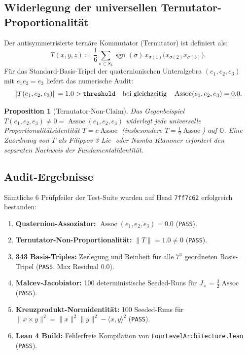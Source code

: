 \documentclass[11pt,a4paper]{article}
\newtheorem{proposition}[theorem]{Proposition}
\theoremstyle{definition}
\newcommand{\Oalg}{\mathbb{O}}
\newcommand{\Assoc}{\operatorname{Assoc}}
\begin{document}
	\subsection{Widerlegung der universellen Ternutator-Proportionalität}
	Der antisymmetrisierte ternäre Kommutator (Ternutator) ist definiert als:
	\begin{equation}
		T(x,y,z) \coloneqq \frac{1}{6} \sum_{\sigma \in S_3} \operatorname{sgn}(\sigma) \, x_{\sigma(1)} \bigl(x_{\sigma(2)} x_{\sigma(3)}\bigr).
	\end{equation}
	Für das Standard-Basis-Tripel der quaternionischen Unteralgebra $(e_1, e_2, e_3)$ mit $e_1 e_2 = e_3$ liefert das numerische Audit:
	\begin{equation}
		\|T(e_1, e_2, e_3)\| = 1.0 > \text{\texttt{threshold}} \quad \text{bei gleichzeitig} \quad \Assoc(e_1, e_2, e_3) = 0.0.
	\end{equation}
	
	\begin{proposition}[Ternutator-Non-Claim]
		Das Gegenbeispiel $T(e_1,e_2,e_3) \neq 0 = \Assoc(e_1,e_2,e_3)$ widerlegt jede universelle Proportionalitätsidentität $T = c \Assoc$ (insbesondere $T = \frac{1}{2}\Assoc$) auf $\Oalg$. Eine Zuordnung von $T$ als Filippov-3-Lie- oder Nambu-Klammer erfordert den separaten Nachweis der Fundamentalidentität.
	\end{proposition}
	
	\subsection{Audit-Ergebnisse}
	Sämtliche 6 Prüfpfeiler der Test-Suite wurden auf Head \texttt{7ff7c62} erfolgreich bestanden:
	\begin{enumerate}
		\item \textbf{Quaternion-Assoziator:} $\Assoc(e_1, e_2, e_3) = 0.0$ (\texttt{PASS}).
		\item \textbf{Ternutator-Non-Proportionalität:} $\|T\| = 1.0 \neq 0$ (\texttt{PASS}).
		\item \textbf{343 Basis-Triples:} Zerlegung und Reinheit für alle $7^3$ geordneten Basis-Tripel (\texttt{PASS}, Max Residual $0.0$).
		\item \textbf{Malcev-Jacobiator:} 100 deterministische Seeded-Runs für $J_\times = \frac{3}{2}\Assoc$ (\texttt{PASS}).
		\item \textbf{Kreuzprodukt-Normidentität:} 100 Seeded-Runs für $\|x \times y\|^2 = \|x\|^2 \|y\|^2 - \langle x,y \rangle^2$ (\texttt{PASS}).
		\item \textbf{Lean 4 Build:} Fehlerfreie Kompilation von \texttt{FourLevelArchitecture.lean} (\texttt{PASS}).
	\end{enumerate}
	
\end{document}
